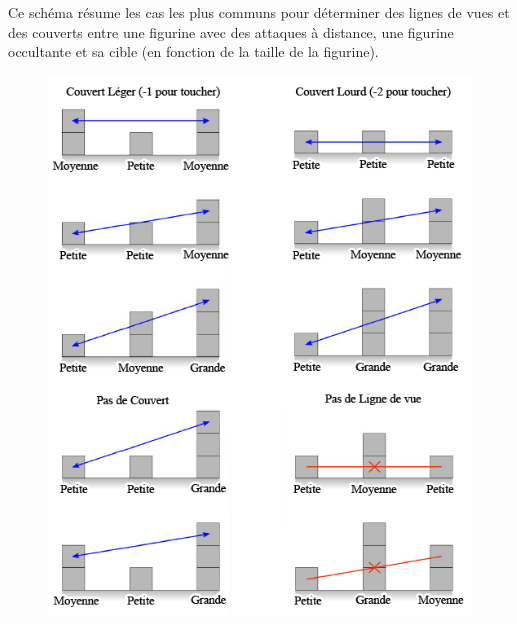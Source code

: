 Ce schéma résume les cas les plus communs pour déterminer des lignes de vues et des couverts entre une figurine avec des attaques à distance, une figurine occultante et sa cible (en fonction de la taille de la figurine).
\begin{figure}[!htbp]
\centering
\includegraphics[width=12cm]{Lignes_de_vue.png}
\end{figure}

